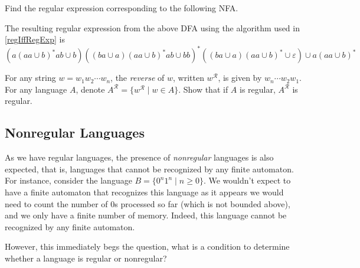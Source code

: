 \vspace{1mm}
\begin{exercise}
Find the regular expression corresponding to the following NFA.
\begin{center}
\end{center}
\end{exercise}
\begin{solution}
The resulting regular expression from the above DFA using the algorithm used in \ref{regIffRegExp} is
$$(a(aa\cup b)^*ab\cup b)((ba\cup a)(aa\cup b)^*ab\cup bb)^*((ba\cup a)(aa\cup b)^*\cup\varepsilon)\cup a(aa\cup b)^*$$
\end{solution}

\begin{exercise}
\label{stringreverse}
For any string $w=w_1w_2\cdots w_n$, the \textit{reverse} of $w$, written $w^\mathcal{R}$, is given by $w_n\cdots w_2w_1$. For any language $A$, denote $A^\mathcal{R}=\{w^\mathcal{R}\mid w\in A\}$. Show that if $A$ is regular, $A^\mathcal{R}$ is regular.
\end{exercise}
\clearpage

\subsection{Nonregular Languages}
As we have regular languages, the presence of \textit{nonregular} languages is also expected, that is, languages that cannot be recognized by any finite automaton. For instance, consider the language $B=\{0^n1^n\mid n\geq 0\}$. We wouldn't expect to have a finite automaton that recognizes this language as it appears we would need to count the number of $0$s processed so far (which is not bounded above), and we only have a finite number of memory. Indeed, this language cannot be recognized by any finite automaton.

\vspace{2mm}
However, this immediately begs the question, what is a condition to determine whether a language is regular or nonregular? 

